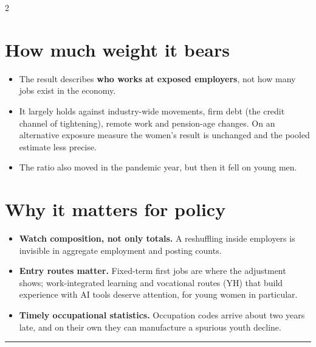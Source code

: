 \documentclass[10pt,a4paper]{article}
\begin{document}
\begin{multicols}{2}
\section{How much weight it bears}
\begin{itemize}[leftmargin=*, itemsep=1.5pt, parsep=0pt, topsep=0pt]
  \item The result describes \textbf{who works at exposed employers}, not how many
        jobs exist in the economy.
  \item It largely holds against industry-wide movements, firm debt (the credit channel of
        tightening), remote work and pension-age changes. On an alternative exposure
        measure the women's result is unchanged and the pooled estimate less precise.
  \item The ratio also moved in the pandemic year, but then it fell on young men.
\end{itemize}

\section{Why it matters for policy}
\begin{itemize}[leftmargin=*, itemsep=1.5pt, parsep=0pt, topsep=0pt]
  \item \textbf{Watch composition, not only totals.} A reshuffling inside employers is
        invisible in aggregate employment and posting counts.
  \item \textbf{Entry routes matter.} Fixed-term first jobs are where the adjustment
        shows; work-integrated learning and vocational routes (YH) that build experience
        with AI tools deserve attention, for young women in particular.
  \item \textbf{Timely occupational statistics.} Occupation codes arrive about two years
        late, and on their own they can manufacture a spurious youth decline.
\end{itemize}

\end{multicols}

\vspace{-0.15cm}
\noindent\textcolor{darkblue}{\rule{\textwidth}{0.4pt}}
\vspace{0.02cm}
\end{document}
